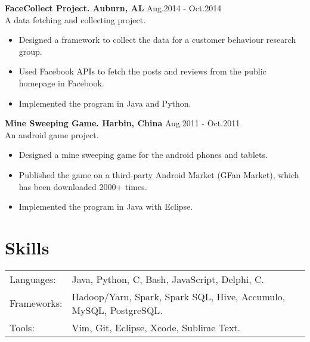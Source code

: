 \documentclass[11pt,margin,line]{res}
\newcommand{\bulletindent}{11pt}
\newcommand{\CC}{C\nolinebreak\hspace{.05em}\raisebox{.4ex}{\tiny\bf +}\nolinebreak\hspace{-.10em}\raisebox{.4ex}{\tiny\bf +}}
\begin{document}
\begin{resume}
    {\bf FaceCollect Project. Auburn, AL}	\hfill   Aug.2014 - Oct.2014 \\
    A data fetching and collecting project.
	\begin{itemize}[leftmargin=\bulletindent]
		\itemsep -2pt
			\item Designed a framework to collect the data for a customer behaviour research group.
			\item Used Facebook APIs to fetch the posts and reviews from the public homepage in Facebook.
    	\item Implemented the program in Java and Python. 
	\end{itemize}

    {\bf Mine Sweeping Game. Harbin, China}	\hfill   Aug.2011 - Oct.2011 \\
    An android game project. 
	\begin{itemize}[leftmargin=\bulletindent]
		\itemsep -2pt
			\item Designed a mine sweeping game for the android phones and tablets.
			\item Published the game on a third-party Android Market (GFan Market), which has been downloaded 2000+ times.
    	\item Implemented the program in Java with Eclipse. 
	\end{itemize}

\section{Skills}
   \begin{tabular}{l p{5in}}
    Languages: & Java, Python, C, Bash, JavaScript, Delphi, \CC{}. \\
    Frameworks: & Hadoop/Yarn, Spark, Spark SQL, Hive, Accumulo, MySQL, PostgreSQL.\\
    Tools:     & Vim, Git, Eclipse, Xcode, Sublime Text. \\
   \end{tabular}

\end{resume}
\end{document}
